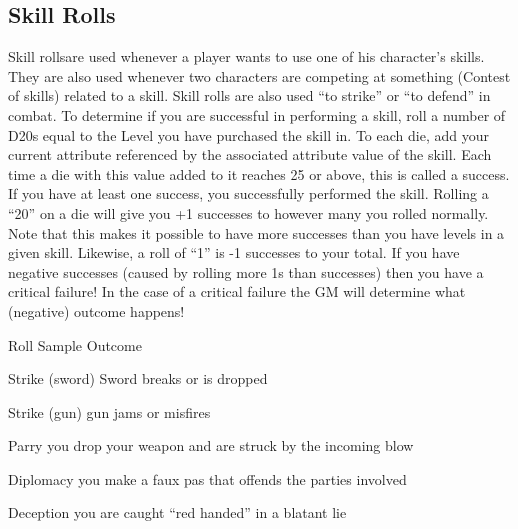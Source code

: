 \documentclass[twoside]{book}
\begin{document}
\subsection{Skill Rolls}
     Skill rollsare used whenever a player wants to use
               one of his character’s skills. They are also used
               whenever two characters are competing at something
               (Contest of skills) related to a skill. Skill rolls are
               also used “to strike” or “to
               defend” in combat.  To determine if you are successful in performing a
               skill, roll a number of D20s equal to the Level you have
               purchased the skill in. To each die, add your current
               attribute referenced by the associated attribute value of
               the skill. Each time a die with this value added to it
               reaches 25 or above, this is called a success. If you have
               at least one success, you successfully performed the
               skill. Rolling a “20” on a die will give you
               +1 successes to however many you rolled normally. Note
               that this makes it possible to have more successes than
               you have levels in a given skill. Likewise, a roll of
               “1” is -1 successes to your total. If you have
               negative successes (caused by rolling more 1s than
               successes) then you have a critical failure! In the case
               of a critical failure the GM will determine what
               (negative) outcome happens!   
                
                  
                   Roll   
                   Sample Outcome   
                  
                  
                   Strike (sword)   
                   Sword breaks or is dropped   
                  
                  
                   Strike (gun)   
                   gun jams or misfires   
                  
                  
                   Parry   
                     you drop your weapon and are struck by the
                     incoming blow 
                  
                  
                   Diplomacy   
                     you make a faux pas that offends the parties
                     involved 
                  
                  
                   Deception   
                     you are caught “red handed” in a
                     blatant lie 
                  
\end{document}
